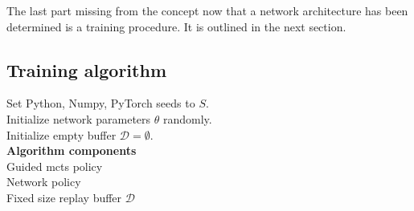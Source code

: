The last part missing from the concept now that a network architecture has been determined is a training procedure. It is outlined in the next section.

\subsection{Training algorithm}\label{ssec:training_loop}
\begin{algorithm}[ht]
\SetAlgoLined
\begin{multicols}{2}
 Set Python, Numpy, PyTorch seeds to $S$.\\
 Initialize network parameters $\theta$ randomly.\\
 Initialize empty buffer $\mathcal D = \emptyset$.\\
 \columnbreak
 {
 \textbf{Algorithm components}\\
 Guided \gls{mcts} policy \phat \\
 Network policy \p\\
 Fixed size replay buffer $\mathcal D$\\ 
}
\end{multicols}
\end{algorithm}
